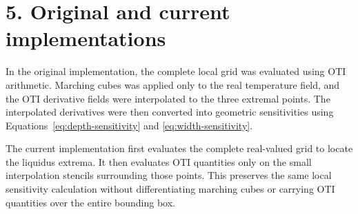 \documentclass[12pt]{article}
\begin{document}
\section*{5. Original and current implementations}

In the original implementation, the complete local grid was evaluated using
OTI arithmetic. Marching cubes was applied only to the real temperature field,
and the OTI derivative fields were interpolated to the three extremal points.
The interpolated derivatives were then converted into geometric sensitivities
using Equations~\eqref{eq:depth-sensitivity} and
\eqref{eq:width-sensitivity}.

The current implementation first evaluates the complete real-valued grid to
locate the liquidus extrema. It then evaluates OTI quantities only on the
small interpolation stencils surrounding those points. This preserves the
same local sensitivity calculation without differentiating marching cubes or
carrying OTI quantities over the entire bounding box.
\end{document}

